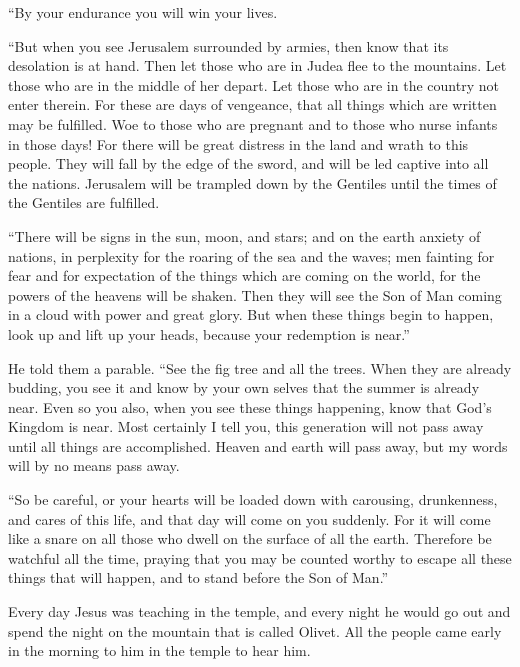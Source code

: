  ``By your endurance you will win your lives.

 ``But when you see Jerusalem surrounded by armies, then
know that its desolation is at hand.  Then let those who
are in Judea flee to the mountains. Let those who are in the middle of
her depart. Let those who are in the country not enter therein.
 For these are days of vengeance, that all things which are
written may be fulfilled.  Woe to those who are pregnant
and to those who nurse infants in those days! For there will be great
distress in the land and wrath to this people.  They will
fall by the edge of the sword, and will be led captive into all the
nations. Jerusalem will be trampled down by the Gentiles until the times
of the Gentiles are fulfilled.

 ``There will be signs in the sun, moon, and stars; and on
the earth anxiety of nations, in perplexity for the roaring of the sea
and the waves;  men fainting for fear and for expectation
of the things which are coming on the world, for the powers of the
heavens will be shaken.  Then they will see the Son of Man
coming in a cloud with power and great glory.  But when
these things begin to happen, look up and lift up your heads, because
your redemption is near.''

 He told them a parable. ``See the fig tree and all the
trees.  When they are already budding, you see it and know
by your own selves that the summer is already near.  Even
so you also, when you see these things happening, know that God's
Kingdom is near.  Most certainly I tell you, this
generation will not pass away until all things are accomplished.
 Heaven and earth will pass away, but my words will by no
means pass away.

 ``So be careful, or your hearts will be loaded down with
carousing, drunkenness, and cares of this life, and that day will come
on you suddenly.  For it will come like a snare on all
those who dwell on the surface of all the earth.  Therefore
be watchful all the time, praying that you may be counted worthy to
escape all these things that will happen, and to stand before the Son of
Man.''

 Every day Jesus was teaching in the temple, and every
night he would go out and spend the night on the mountain that is called
Olivet.  All the people came early in the morning to him in
the temple to hear him.

